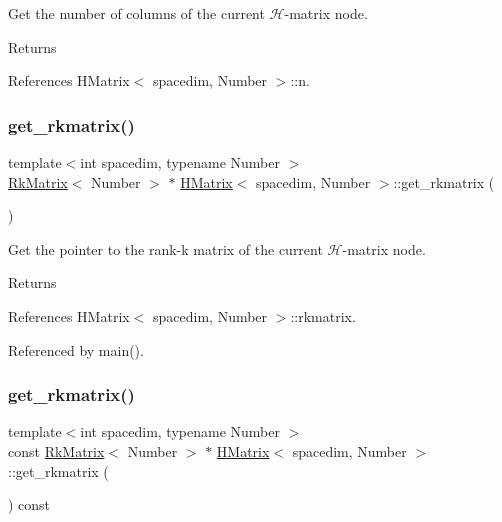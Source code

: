 Get the number of columns of the current $\mathcal{H}$-\/matrix node. \begin{DoxyReturn}{Returns}

\end{DoxyReturn}


References H\+Matrix$<$ spacedim, Number $>$\+::n.

\mbox{\label{classHMatrix_a0189de6e276fbd3425c4a7ef132f5e16}} 
\subsubsection{\texorpdfstring{get\+\_\+rkmatrix()}{get\_rkmatrix()}\hspace{0.1cm}{\footnotesize\ttfamily [1/2]}}
{\footnotesize\ttfamily template$<$int spacedim, typename Number $>$ \\
\hyperlink{classRkMatrix}{Rk\+Matrix}$<$ Number $>$ $\ast$ \hyperlink{classHMatrix}{H\+Matrix}$<$ spacedim, Number $>$\+::get\+\_\+rkmatrix (\begin{DoxyParamCaption}{ }\end{DoxyParamCaption})}

Get the pointer to the rank-\/k matrix of the current $\mathcal{H}$-\/matrix node. \begin{DoxyReturn}{Returns}

\end{DoxyReturn}


References H\+Matrix$<$ spacedim, Number $>$\+::rkmatrix.



Referenced by main().

\mbox{\label{classHMatrix_a64c81db6357d0e00b82fd523af001ae5}} 
\subsubsection{\texorpdfstring{get\+\_\+rkmatrix()}{get\_rkmatrix()}\hspace{0.1cm}{\footnotesize\ttfamily [2/2]}}
{\footnotesize\ttfamily template$<$int spacedim, typename Number $>$ \\
const \hyperlink{classRkMatrix}{Rk\+Matrix}$<$ Number $>$ $\ast$ \hyperlink{classHMatrix}{H\+Matrix}$<$ spacedim, Number $>$\+::get\+\_\+rkmatrix (\begin{DoxyParamCaption}{ }\end{DoxyParamCaption}) const}

